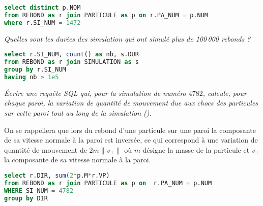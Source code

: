 \begin{Answer}
\begin{lstlisting}[language=SQL]
select distinct p.NOM
from REBOND as r join PARTICULE as p on r.PA_NUM = p.NUM
where r.SI_NUM = 1472
\end{lstlisting}
\end{Answer}
\begin{Exercise}\it 
Quelles sont les durées des simulation qui ont simulé plus de 100\,000 rebonds ?
\end{Exercise}
\begin{Answer}
\begin{lstlisting}[language=SQL]
select r.SI_NUM, count() as nb, s.DUR
from REBOND as r join SIMULATION as s
group by r.SI_NUM
having nb > 1e5
\end{lstlisting}
\end{Answer}
\begin{Exercise}\it 
Écrire une requête SQL qui, pour la simulation de numéro $4782$, calcule, pour chaque paroi, la variation de quantité de mouvement due aux chocs des particules sur cette paroi tout au long de la simulation (). 

On se rappellera que lors du rebond d'une particule sur une paroi la composante de sa vitesse normale à la paroi est inversée, ce qui correspond à une variation de quantité de mouvement de $2m\|v_\perp\|$ où $m$ désigne la masse de la particule et $v_\perp$ la composante de sa vitesse normale à la paroi.
\end{Exercise}
\begin{Answer}
\begin{lstlisting}[language=SQL]
select r.DIR, sum(2*p.M*r.VP)
from REBOND as r join PARTICULE as p on  r.PA_NUM = p.NUM
WHERE SI_NUM = 4782
group by DIR
\end{lstlisting}
\end{Answer}

